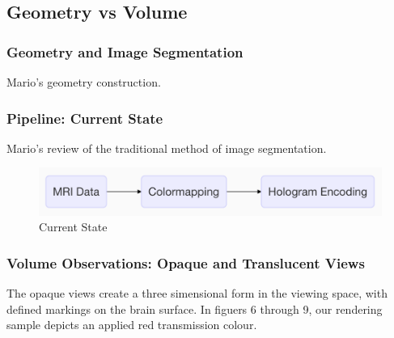 \subsection{Geometry vs Volume}

\subsubsection{Geometry and Image Segmentation}
Mario's geometry construction.

\subsubsection{Pipeline: Current State}
Mario's review of the traditional method of image segmentation.

\begin{figure}[h]
 \centering %
 \includegraphics[width=\columnwidth]{pictures/general-model.png}
 \caption{Current State}
 \label{fig:general-model}
\end{figure}

\subsubsection{Volume Observations: Opaque and Translucent Views}
The opaque views create a three simensional form in the viewing space, with defined markings on the brain surface. In figuers 6 through 9, our rendering sample depicts an applied red transmission colour.


